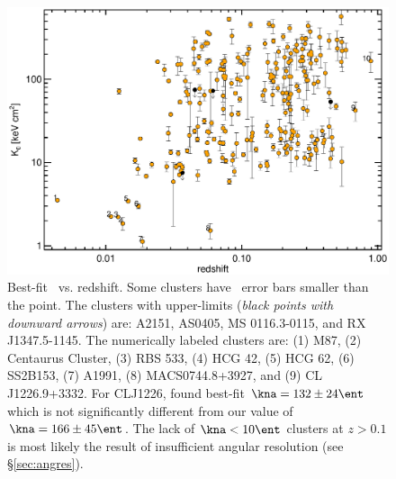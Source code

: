 \clearpage
\begin{figure}[htp]
  \begin{center}
    \begin{minipage}[htp]{0.9\linewidth}
      \includegraphics*[width=\textwidth, trim=5mm 0mm 5mm 5mm, clip]{k0res.eps}
      \caption{Best-fit \kna\ vs. redshift. Some clusters have
        \kna\ error bars smaller than the point. The clusters with
        upper-limits ({\it{black points with downward arrows}}) are: A2151,
        AS0405, MS 0116.3-0115, and RX J1347.5-1145. The numerically
        labeled clusters are: (1) M87, (2) Centaurus Cluster, (3) RBS
        533, (4) HCG 42, (5) HCG 62, (6) SS2B153, (7) A1991, (8)
        MACS0744.8+3927, and (9) CL J1226.9+3332. For CLJ1226,
        \cite{2007ApJ...659.1125M} found best-fit $\kna = 132 \pm 24
        \ent$ which is not significantly different from our value of
        $\kna = 166 \pm 45 \ent$. The lack of $\kna < 10 \ent$ clusters
        at $z > 0.1$ is most likely the result of insufficient angular
        resolution (see \S\ref{sec:angres}).}
      \label{fig:k0res}
    \end{minipage}
  \end{center}
\end{figure}



